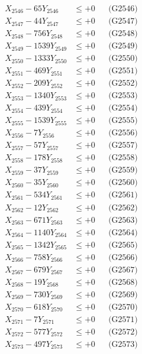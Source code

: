 \documentclass[a4paper,10pt]{article}
\begin{document}
{\begin{align}
X_{2546} - 65Y_{2546} &\leq +0 && \text{(G2546)} \\
X_{2547} - 44Y_{2547} &\leq +0 && \text{(G2547)} \\
X_{2548} - 756Y_{2548} &\leq +0 && \text{(G2548)} \\
X_{2549} - 1539Y_{2549} &\leq +0 && \text{(G2549)} \\
X_{2550} - 1333Y_{2550} &\leq +0 && \text{(G2550)} \\
\allowbreak
X_{2551} - 469Y_{2551} &\leq +0 && \text{(G2551)} \\
X_{2552} - 209Y_{2552} &\leq +0 && \text{(G2552)} \\
X_{2553} - 1340Y_{2553} &\leq +0 && \text{(G2553)} \\
X_{2554} - 439Y_{2554} &\leq +0 && \text{(G2554)} \\
X_{2555} - 1539Y_{2555} &\leq +0 && \text{(G2555)} \\
X_{2556} - 7Y_{2556} &\leq +0 && \text{(G2556)} \\
X_{2557} - 57Y_{2557} &\leq +0 && \text{(G2557)} \\
X_{2558} - 178Y_{2558} &\leq +0 && \text{(G2558)} \\
X_{2559} - 37Y_{2559} &\leq +0 && \text{(G2559)} \\
X_{2560} - 35Y_{2560} &\leq +0 && \text{(G2560)} \\
\allowbreak
X_{2561} - 534Y_{2561} &\leq +0 && \text{(G2561)} \\
X_{2562} - 12Y_{2562} &\leq +0 && \text{(G2562)} \\
X_{2563} - 671Y_{2563} &\leq +0 && \text{(G2563)} \\
X_{2564} - 1140Y_{2564} &\leq +0 && \text{(G2564)} \\
X_{2565} - 1342Y_{2565} &\leq +0 && \text{(G2565)} \\
X_{2566} - 758Y_{2566} &\leq +0 && \text{(G2566)} \\
X_{2567} - 679Y_{2567} &\leq +0 && \text{(G2567)} \\
X_{2568} - 19Y_{2568} &\leq +0 && \text{(G2568)} \\
X_{2569} - 730Y_{2569} &\leq +0 && \text{(G2569)} \\
X_{2570} - 618Y_{2570} &\leq +0 && \text{(G2570)} \\
\allowbreak
X_{2571} - 7Y_{2571} &\leq +0 && \text{(G2571)} \\
X_{2572} - 577Y_{2572} &\leq +0 && \text{(G2572)} \\
X_{2573} - 497Y_{2573} &\leq +0 && \text{(G2573)} \\

\end{align}}
\end{document}
